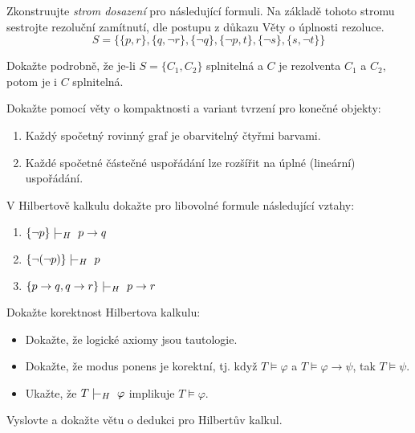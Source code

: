 \documentclass[a4paper,12pt]{article}
\begin{document}
        
    \medskip\begin{problem}
        Zkonstruujte \emph{strom dosazení} pro následující formuli. Na základě tohoto stromu sestrojte rezoluční zamítnutí, dle postupu z důkazu Věty o úplnosti rezoluce.
        $$
        S=\{\{p,r\},\{q,\neg r\},\{\neg q\},\{\neg p,t\},\{\neg s\},\{s,\neg t\}\}
        $$
        
    \end{problem}
    
    
    \medskip\begin{problem}
        Dokažte podrobně, že je-li $S=\{C_1,C_2\}$ splnitelná a $C$ je rezolventa $C_1$ a $C_2$, potom je i $C$ splnitelná.
    \end{problem}
    
        
    \medskip\begin{problem} Dokažte pomocí věty o kompaktnosti a variant tvrzení pro konečné objekty:
    \begin{enumerate}
        \item Každý spočetný rovinný graf je obarvitelný čtyřmi barvami.
        \item Každé spočetné částečné uspořádání lze rozšířit na úplné (lineární) uspořádání.
    \end{enumerate}
    
    \end{problem}
        
    
    \medskip\begin{problem}
    V Hilbertově kalkulu dokažte pro libovolné formule následující vztahy:
    \begin{enumerate}
        \item $\{\neg p\}\proves_H\ p\to q$
        \item $\{\neg(\neg p)\}\proves_H\ p$
        \item $\{p\to q,q \to r\}\proves_H\ p\to r$
    \end{enumerate}    
    \end{problem}
    
    \medskip\begin{problem}
        Dokažte korektnost Hilbertova kalkulu:
        \begin{itemize}
            \item Dokažte, že logické axiomy jsou tautologie.
            \item Dokažte, že modus ponens je korektní, tj. když $T\models\varphi$ a $T\models\varphi\to\psi$, tak $T\models\psi$.
            \item Ukažte, že $T\proves_H\ \varphi$ implikuje $T\models\varphi$.
        \end{itemize}
        \end{problem}
        
    \medskip\begin{problem}
        Vyslovte a dokažte větu o dedukci pro Hilbertův kalkul.
    \end{problem}
       
\end{document}
